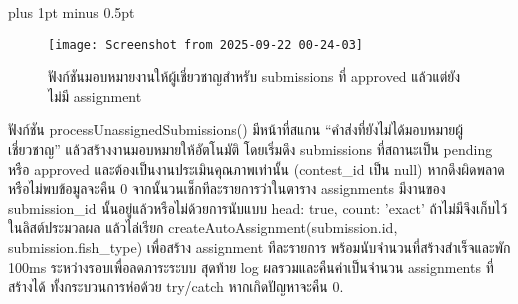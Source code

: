 
\clearpage
\thispagestyle{plain}

\begingroup
\fontsize{16pt}{19.2pt}\selectfont
\justifying
\XeTeXlinebreakskip=0pt plus 1pt minus 0.5pt
\setlength{\parindent}{1.5cm}
\setlength{\parskip}{0pt}

\begin{figure}[h]
	\centering
	\texttt{[image: Screenshot from 2025-09-22 00-24-03]}
	\caption{ฟังก์ชันมอบหมายงานให้ผู้เชี่ยวชาญสำหรับ submissions ที่ approved แล้วแต่ยังไม่มี assignment}
\end{figure}

\indent ฟังก์ชัน processUnassignedSubmissions() มีหน้าที่สแกน “คำส่งที่ยังไม่ได้มอบหมายผู้เชี่ยวชาญ” แล้วสร้างงานมอบหมายให้อัตโนมัติ โดยเริ่มดึง submissions ที่สถานะเป็น pending หรือ approved และต้องเป็นงานประเมินคุณภาพเท่านั้น (contest\_id เป็น null) หากดึงผิดพลาดหรือไม่พบข้อมูลจะคืน 0 จากนั้นวนเช็กทีละรายการว่าในตาราง assignments มีงานของ submission\_id นั้นอยู่แล้วหรือไม่ด้วยการนับแบบ head: true, count: 'exact' ถ้าไม่มีจึงเก็บไว้ในลิสต์ประมวลผล แล้วไล่เรียก createAutoAssignment(submission.id, submission.fish\_type) เพื่อสร้าง assignment ทีละรายการ พร้อมนับจำนวนที่สร้างสำเร็จและพัก 100ms ระหว่างรอบเพื่อลดภาระระบบ สุดท้าย log ผลรวมและคืนค่าเป็นจำนวน assignments ที่สร้างได้ ทั้งกระบวนการห่อด้วย try/catch หากเกิดปัญหาจะคืน 0.

\clearpage